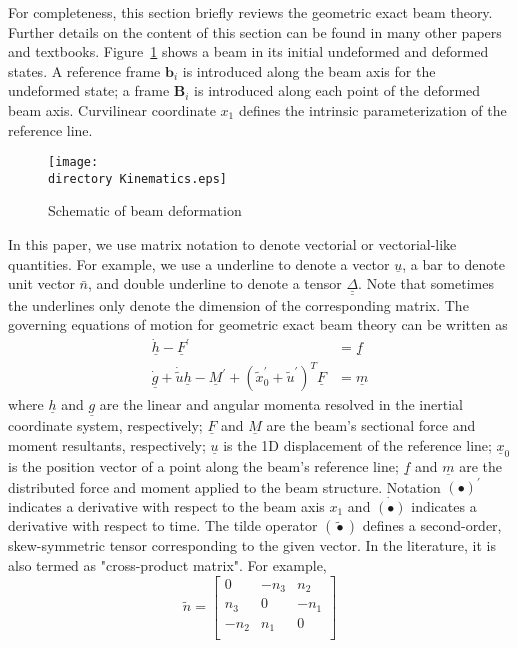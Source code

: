 \documentclass{aiaa-tc}
\def\directory{EPSF/}
\renewcommand{\vec}[1]{\underline{#1}}
\renewcommand{\skew}[1]{\widetilde{#1}}
\begin{document}
For completeness, this section briefly reviews the geometric exact beam theory. Further details on the content of this section can be found in many other papers and textbooks.
Figure~\ref{Kinematics} shows a beam in its initial undeformed
and deformed states. A reference frame $\mathbf{b}_i$ is introduced along the
beam axis for the undeformed state; a frame $\mathbf{B}_i$ is introduced
along each point of the deformed beam axis. Curvilinear coordinate $x_1$ defines the intrinsic parameterization of the reference line.
\begin{figure}
\centering
\texttt{[image: \\directory Kinematics.eps]}
\caption{Schematic of beam deformation} \label{Kinematics}
\end{figure}
In this paper, we use matrix notation to denote vectorial or vectorial-like quantities. For example, we use a underline to denote a vector $\underline{u}$, a bar to denote unit vector $\bar{n}$, and double underline to denote a tensor $\underline{\underline{\Delta}}$. Note that sometimes the underlines only denote the dimension of the corresponding matrix. The governing equations of motion for geometric exact beam theory can be written as \cite{Bauchau:2010}
\begin{align}
	\label{GovernGEBT-1}
	\dot{\underline{h}} - \underline{F}^\prime &= \underline{f} \\
	\label{GovernGEBT-2}
	\dot{\underline{g}} + \dot{\tilde{u}} \underline{h} - \underline{M}^\prime + (\tilde{x}_0^\prime + \tilde{u}^\prime)^T \underline{F} &= \underline{m}
\end{align}
where $\vec{h}$ and $\vec{g}$ are the linear and angular momenta resolved in the inertial coordinate system, respectively; $\vec{F}$ and $\vec{M}$ are the beam's sectional force and moment resultants, respectively; $\vec{u}$ is the 1D displacement of the reference line; $\vec{x}_0$ is the position vector of a point along the beam's reference line; $\vec{f}$ and $\vec{m}$ are the distributed force and moment applied to the beam structure.  Notation $(\bullet)^\prime$ indicates a derivative with respect to the beam axis $x_1$ and $\dot{(\bullet)}$ indicates a derivative with respect to time. The tilde operator $(\skew{\bullet})$ defines a second-order, skew-symmetric tensor corresponding to the given vector. In the literature, it is also termed as "cross-product matrix". For example,
\[
	\skew{n} = 
	     		\begin{bmatrix}
			0 & -n_3 & n_2 \\
			n_3 & 0 & -n_1 \\
			-n_2 & n_1 & 0\\
			\end{bmatrix}	
\]
\end{document}
